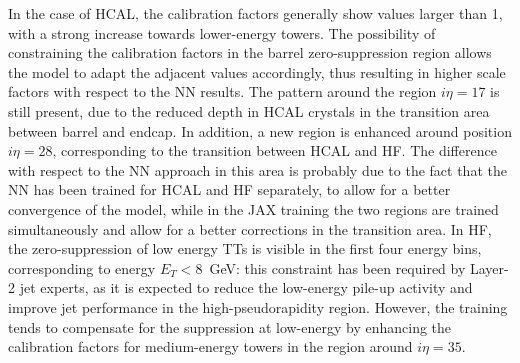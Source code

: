 In the case of HCAL, the calibration factors generally show values larger than 1, with a strong increase towards lower-energy towers. 
The possibility of constraining the calibration factors in the barrel zero-suppression region allows the model to adapt the adjacent values accordingly, thus resulting in higher scale factors with respect to the NN results.
The pattern around the region $i\eta=17$ is still present, due to the reduced depth in HCAL crystals in the transition area between barrel and endcap. In addition, a new region is enhanced around position $i\eta=28$, corresponding to the transition between HCAL and HF. The difference with respect to the NN approach in this area is probably due to the fact that the NN has been trained for HCAL and HF separately, to allow for a better convergence of the model, while in the JAX training the two regions are trained simultaneously and allow for a better corrections in the transition area.
In HF, the zero-suppression of low energy TTs is visible in the first four energy bins, corresponding to energy $E_T<8$~GeV: this constraint has been required by Layer-2 jet experts, as it is expected to reduce the low-energy pile-up activity and improve jet performance in the high-pseudorapidity region. However, the training tends to compensate for the suppression at low-energy by enhancing the calibration factors for medium-energy towers in the region around $i\eta=35$.

